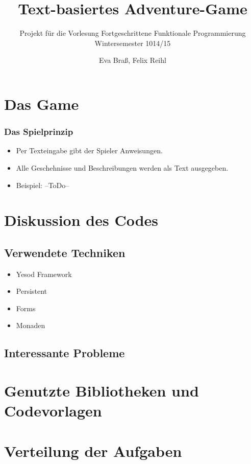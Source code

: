 \documentclass[hyperref={pdfpagelabels=false}]{beamer}
\title{Text-basiertes Adventure-Game}
\author{Eva Braß, Felix Reihl}
\subtitle{Projekt für die Vorlesung Fortgeschrittene Funktionale Programmierung\\Wintersemester 1014/15}
\begin{document}
\begin{frame} \titlepage
\end{frame} 
\begin{frame}
	\tableofcontents
\end{frame} 
\section{Das Game}
\begin{frame}
	\frametitle{Das Spielprinzip}
		\begin{itemize}
		\item Per Texteingabe gibt der Spieler Anweisungen.
		\item Alle Geschehnisse und Beschreibungen werden als Text ausgegeben.
		\item Beispiel: --ToDo--
		\end{itemize}
\end{frame} 
\section{Diskussion des Codes}
\begin{frame}
\end{frame}
\subsection{Verwendete Techniken}
\begin{frame}
		\begin{itemize}
		\item Yesod Framework
		\item Persistent
		\item Forms
		\item Monaden
		\end{itemize}
\end{frame}
\subsection{Interessante Probleme}
\begin{frame}
\end{frame}
\section{Genutzte Bibliotheken und Codevorlagen}
\begin{frame}
\end{frame}
\section{Verteilung der Aufgaben}
\begin{frame}
\end{frame}
\end{document}
